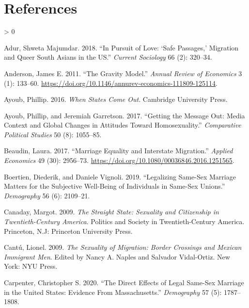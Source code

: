 \documentclass[
  11pt,
]{article}
\newlength{\cslhangindent}
\newenvironment{CSLReferences}[2] %
 {%
  \setlength{\parindent}{0pt}
  \ifodd #1 \everypar{\setlength{\hangindent}{\cslhangindent}}\ignorespaces\fi
  \ifnum #2 > 0
  \setlength{\parskip}{#2\baselineskip}
  \fi
 }%
 {}
\begin{document}
\hypertarget{references}{%
\section{References}\label{references}}

\setlength{\parindent}{-0.2in}
\setlength{\leftskip}{0.2in}
\setlength{\parskip}{8pt}

\noindent

\hypertarget{refs}{}
\begin{CSLReferences}{1}{0}
\leavevmode\hypertarget{ref-adur_2018}{}%
Adur, Shweta Majumdar. 2018. {``In Pursuit of Love: {`{Safe} Passages,'} Migration and Queer {South} {Asians} in the {US}.''} \emph{Current Sociology} 66 (2): 320--34.

\leavevmode\hypertarget{ref-anderson_2011}{}%
Anderson, James E. 2011. {``The {Gravity} {Model}.''} \emph{Annual Review of Economics} 3 (1): 133--60. \url{https://doi.org/10.1146/annurev-economics-111809-125114}.

\leavevmode\hypertarget{ref-ayoub_2016}{}%
Ayoub, Phillip. 2016. \emph{When {States} {Come} {Out}}. Cambridge University Press.

\leavevmode\hypertarget{ref-ayoub_2017}{}%
Ayoub, Phillip, and Jeremiah Garretson. 2017. {``Getting the Message Out: {Media} Context and Global Changes in Attitudes Toward Homosexuality.''} \emph{Comparative Political Studies} 50 (8): 1055--85.

\leavevmode\hypertarget{ref-beaudin_2017}{}%
Beaudin, Laura. 2017. {``Marriage Equality and Interstate Migration.''} \emph{Applied Economics} 49 (30): 2956--73. \url{https://doi.org/10.1080/00036846.2016.1251565}.

\leavevmode\hypertarget{ref-boertien_2019}{}%
Boertien, Diederik, and Daniele Vignoli. 2019. {``Legalizing Same-Sex Marriage Matters for the Subjective Well-Being of Individuals in Same-Sex Unions.''} \emph{Demography} 56 (6): 2109--21.

\leavevmode\hypertarget{ref-canaday_2009}{}%
Canaday, Margot. 2009. \emph{The Straight State: Sexuality and Citizenship in Twentieth-Century {America}}. Politics and Society in Twentieth-Century {America}. Princeton, N.J: Princeton University Press.

\leavevmode\hypertarget{ref-cantu_2009}{}%
Cantú, Lionel. 2009. \emph{The {Sexuality} of {Migration}: {Border} {Crossings} and {Mexican} {Immigrant} {Men}}. Edited by Nancy A. Naples and Salvador Vidal-Ortiz. New York: NYU Press.

\leavevmode\hypertarget{ref-carpenter_2020}{}%
Carpenter, Christopher S. 2020. {``The {Direct} {Effects} of {Legal} {Same}-{Sex} {Marriage} in the {United} {States}: {Evidence} {From} {Massachusetts}.''} \emph{Demography} 57 (5): 1787--1808.


\end{CSLReferences}
\end{document}
